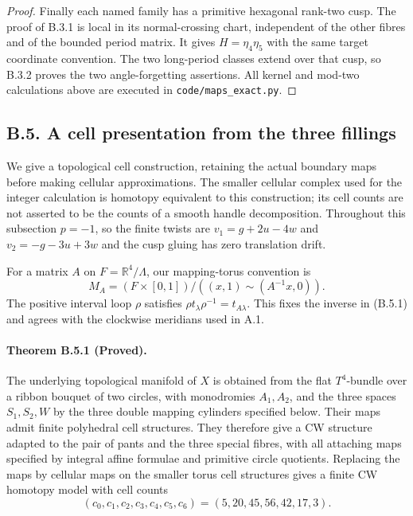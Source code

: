 \begin{proof}
Finally each named family has a
primitive hexagonal rank-two cusp.
The proof of B.3.1 is local in its
normal-crossing chart, independent
of the other fibres and of the
bounded period matrix.  It gives
$H=\eta_4\eta_5$ with the same target
coordinate convention.  The two
long-period classes extend over
that cusp, so B.3.2 proves the
two angle-forgetting assertions.
All kernel and mod-two calculations
above are executed in
\texttt{code/maps\_exact.py}.
\end{proof}

\subsection{B.5. A cell presentation from the three fillings}

We give a topological cell construction, retaining the actual
boundary maps before making cellular approximations.  The
smaller cellular complex used for the integer calculation is
homotopy equivalent to this construction; its cell counts are
not asserted to be the counts of a smooth handle decomposition.
Throughout this subsection $p=-1$, so the finite twists are
$v_1=g+2u-4w$ and $v_2=-g-3u+3w$ and the cusp gluing has
zero translation drift.

For a matrix $A$ on $F=\mathbb R^4/\Lambda$, our mapping-torus
convention is
\[
 M_A=(F\times[0,1])/((x,1)\sim(A^{-1}x,0)).
 \tag{B.5.1}
\]
The positive interval loop $\rho$ satisfies
$\rho t_\lambda\rho^{-1}=t_{A\lambda}$.  This fixes the
inverse in (B.5.1) and agrees with the clockwise meridians
used in A.1.

\paragraph{Theorem B.5.1 (Proved).}
The underlying topological manifold of $X$ is obtained from
the flat $T^4$-bundle over a ribbon bouquet of two circles,
with monodromies $A_1,A_2$, and the three spaces $S_1,S_2,W$
by the three double mapping cylinders specified below.
Their maps admit finite polyhedral cell structures.  They
therefore give a CW structure adapted to the pair of pants
and the three special fibres, with all attaching maps
specified by integral affine formulae and primitive circle
quotients.  Replacing the maps by cellular maps on the smaller
torus cell structures gives a finite CW homotopy model with
cell counts
\[
 (c_0,c_1,c_2,c_3,c_4,c_5,c_6)
       =(5,20,45,56,42,17,3).
 \tag{B.5.2}
\]

